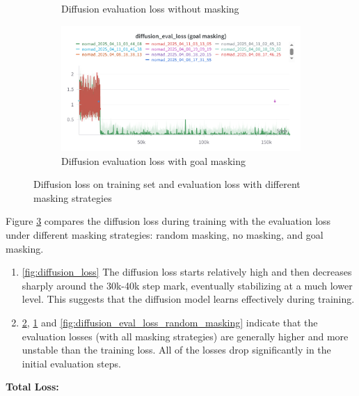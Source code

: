 \documentclass[12pt]{article}
\begin{document}
\begin{figure}[H]
\begin{subfigure}[H]{0.48\textwidth}
        \caption{Diffusion evaluation loss without masking}
        \label{fig:diffusion_eval_loss_no_masking}
    \end{subfigure}
    \hfill
    \begin{subfigure}[H]{0.48\textwidth}
        \centering
        \includegraphics[width=\textwidth]{images/diffusion_eval_loss_goal_masking.png}
        \caption{Diffusion evaluation loss with goal masking}
        \label{fig:diffusion_eval_loss_goal_masking}
    \end{subfigure}
    \caption{Diffusion loss on training set and evaluation loss with different masking strategies}
   \label{fig:diffusion_loss_figure} 
\end{figure}
Figure \ref{fig:diffusion_loss_figure} compares the diffusion loss during training with the evaluation loss under different masking strategies: random masking, no masking, and goal masking.\\
\begin{enumerate}
    \item \ref{fig:diffusion_loss} The diffusion loss starts relatively high and then decreases sharply around the 30k-40k step mark, eventually stabilizing at a much lower level. This suggests that the diffusion model learns effectively during training.
    \item \ref{fig:diffusion_eval_loss_goal_masking}, \ref{fig:diffusion_eval_loss_no_masking} and \ref{fig:diffusion_eval_loss_random_masking} indicate that the evaluation losses (with all masking strategies) are generally higher and more unstable than the training loss. All of the losses drop significantly in the initial evaluation steps.
\end{enumerate}
\newpage
\noindent \textbf{Total Loss:}\\
\end{document}
